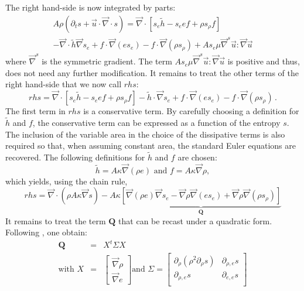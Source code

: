 \documentclass[preprint,10pt]{elsarticle}
\renewcommand{\div}{\vec{\nabla}\! \cdot \!}
\newcommand{\grad}{\vec{\nabla}}
\begin{document}
%
The right hand-side is now integrated by parts:
%
\begin{multline}
\label{eq:ent_res_app3}
A \rho \left( \partial_t s + \vec{u} \cdot \div s \right) = \div \left[ s_e \tilde{h}-s_e e f  + \rho s_{\rho} f \right]  \\
-\div \tilde{h} \grad s_e  + f \cdot \grad (e s_e) -  f \cdot \grad ( \rho s_{\rho} ) + A s_e \mu \grad^s \vec{u} : \grad \vec{u} 
\end{multline}
%
where $\grad^s$ is the symmetric gradient. The term $A s_e \mu \grad^s \vec{u} : \grad \vec{u}$ is positive and thus, 
does not need any further modification. It %
remains to treat the other terms of the right hand-side that we now call $rhs$:
%
\begin{equation}
rhs = \div \left[ s_e \tilde{h}-s_e e f  + \rho s_{\rho} f \right] - \tilde{h} \cdot \grad s_e  + f \cdot \grad (e s_e) - f \cdot \grad ( \rho s_{\rho} )  \,. \nonumber
\end{equation}
%
The first term in $rhs$ is a conservative term. By carefully choosing a definition for $\tilde{h}$ and $f$, the 
conservative term can be expressed as a function of the entropy $s$. The inclusion of the variable area in the 
choice of the dissipative terms is also required so that, when assuming constant area, the standard Euler 
equations are recovered. The following definitions for $\tilde{h}$ and $f$ are chosen:
%
\begin{equation}
\tilde{h} = A \kappa \grad ( \rho e ) \text{  and  } f = A \kappa \grad \rho, \nonumber 
\end{equation}
%
which yields, using the chain rule,
%
\begin{equation}
rhs = \div (\rho A \kappa \grad s ) - A \kappa \underbrace{\left[ \grad (\rho e) \grad s_e  - \grad \rho \grad (e s_e) +  \grad \rho \grad ( \rho s_{\rho} )  \right]}_{\mathbf{Q}} \nonumber
\end{equation}
%
It remains to treat the term $\mathbf{Q}$ that can be recast under a quadratic form. Following \cite{jlg}, one obtain:
%
\begin{eqnarray}
\mathbf{Q} &=& X^t \Sigma X \nonumber \\
\text{with } X &=& \begin{bmatrix}
\grad \rho \\
\grad e 
\end{bmatrix}
\text{and } \Sigma = \begin{bmatrix}
       \partial_{\rho} (\rho^2 \partial_{\rho} s) & \partial_{\rho,e} s  \\[0.3em]
       \partial_{\rho,e} s & \partial_{e,e} s           \\[0.3em]
     \end{bmatrix} \nonumber 
\end{eqnarray}
\end{document}
